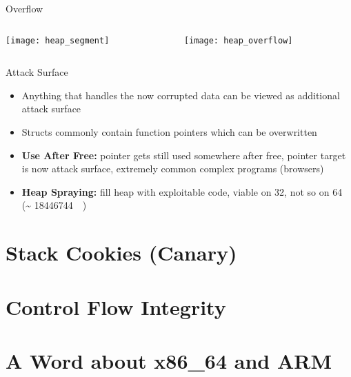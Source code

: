 \documentclass[beamer]{uibk}
\begin{document}
\begin{frame}{Overflow}
    \begin{columns}
        \begin{column}{0.5\textwidth}
            \begin{center}
                \texttt{[image: heap\_segment]}
            \end{center}
        \end{column}
        \begin{column}{0.5\textwidth}
            \begin{center}
                \texttt{[image: heap\_overflow]}
            \end{center}
        \end{column}
    \end{columns}
\end{frame}

\begin{frame}{Attack Surface}
    \begin{itemize}
        \item Anything that handles the now corrupted data can be viewed as
            additional attack surface
        \medskip
        \pause
        \item Structs commonly contain function pointers which can be
            overwritten
        \bigskip
        \pause
        \item \textbf{Use After Free:} pointer gets still used somewhere after
            free, pointer target is now attack surface, extremely common
            complex programs (browsers)
        \medskip
        \item \textbf{Heap Spraying:} fill heap with exploitable code, viable
            on \SI{32}{\bit}, not so on \SI{64}{\bit} (\textasciitilde
            \SI{18446744}{\tera\byte})
    \end{itemize}
\end{frame}

\section{Stack Cookies (Canary)}

\section{Control Flow Integrity}

\section{A Word about x86\_64 and ARM}
\end{document}
